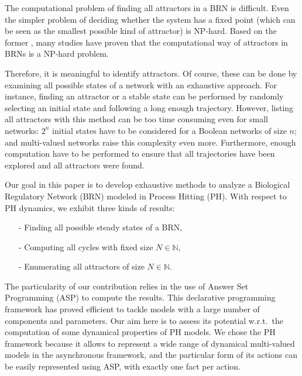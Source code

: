 
The computational problem of finding all attractors in a BRN is difficult. Even the simpler problem of deciding whether the system has a fixed point (which can be seen as the smallest possible kind of attractor) is NP-hard.
Based on the former , many studies have proven that the computational way of attractors in BRNs is a NP-hard problem. 

Therefore, it is meaningful to identify attractors. Of course, these can be done by examining all possible states of a network with an exhaustive approach. For instance, finding an attractor or a stable state can be performed by randomly selecting an initial state and following a long enough trajectory.
However, listing all attractors with this method can be too time consuming even for small networks: $2^n$ initial states have to be considered for a Boolean networks of size $n$; and multi-valued networks raise this complexity even more. Furthermore, enough computation have to be performed to ensure that all trajectories have been explored and all attractors were found.


Our goal in this paper is to develop exhaustive methods to analyze a Biological Regulatory Network (BRN) modeled in Process Hitting (PH). With respect to PH dynamics, we exhibit three kinds of results:
\begin{itemize}
\item[-] Finding all possible steady states of a BRN,
\item[-] Computing all cycles with fixed size $N \in \mathbb{N}$,
\item[-] Enumerating all attractors of size $N \in \mathbb{N}$.
\end{itemize}
The particularity of our contribution relies in the use of Answer Set Programming
(ASP) \cite{baral2003knowledge}
to compute the results.
This declarative programming framework has proved efficient
to tackle models with a large number of components and parameters.
Our aim here is to assess its potential w.r.t.\ the computation
of some dynamical properties of PH models.
We chose the PH framework because it allows to represent a wide range of dynamical multi-valued models in the asynchronous framework, and the particular form of its actions
can be easily represented using ASP,
with exactly one fact per action.
